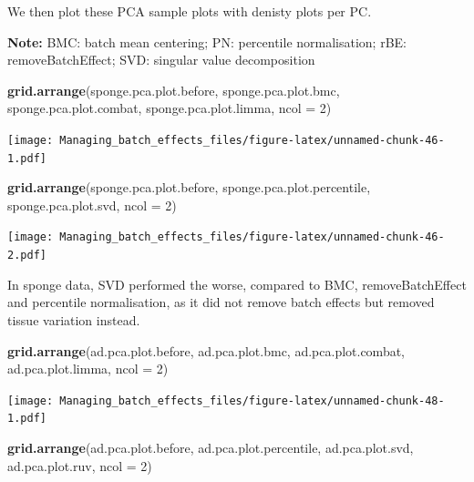 \documentclass[]{book}
\newenvironment{Shaded}{\begin{snugshade}}{\end{snugshade}}
\newcommand{\KeywordTok}[1]{\textcolor[rgb]{0.13,0.29,0.53}{\textbf{#1}}}
\newcommand{\DataTypeTok}[1]{\textcolor[rgb]{0.13,0.29,0.53}{#1}}
\newcommand{\DecValTok}[1]{\textcolor[rgb]{0.00,0.00,0.81}{#1}}
\newcommand{\NormalTok}[1]{#1}
\begin{document}
We then plot these PCA sample plots with denisty plots per PC.

\textbf{Note:} BMC: batch mean centering; PN: percentile normalisation;
rBE: removeBatchEffect; SVD: singular value decomposition

\begin{Shaded}
\begin{Highlighting}[]
\KeywordTok{grid.arrange}\NormalTok{(sponge.pca.plot.before, sponge.pca.plot.bmc, }
\NormalTok{             sponge.pca.plot.combat, sponge.pca.plot.limma, }\DataTypeTok{ncol =} \DecValTok{2}\NormalTok{)}
\end{Highlighting}
\end{Shaded}

\texttt{[image: Managing\_batch\_effects\_files/figure-latex/unnamed-chunk-46-1.pdf]}

\begin{Shaded}
\begin{Highlighting}[]
\KeywordTok{grid.arrange}\NormalTok{(sponge.pca.plot.before, sponge.pca.plot.percentile, }
\NormalTok{             sponge.pca.plot.svd, }\DataTypeTok{ncol =} \DecValTok{2}\NormalTok{)}
\end{Highlighting}
\end{Shaded}

\texttt{[image: Managing\_batch\_effects\_files/figure-latex/unnamed-chunk-46-2.pdf]}

In sponge data, SVD performed the worse, compared to BMC,
removeBatchEffect and percentile normalisation, as it did not remove
batch effects but removed tissue variation instead.

\begin{Shaded}
\begin{Highlighting}[]
\KeywordTok{grid.arrange}\NormalTok{(ad.pca.plot.before, ad.pca.plot.bmc, }
\NormalTok{             ad.pca.plot.combat, ad.pca.plot.limma, }\DataTypeTok{ncol =} \DecValTok{2}\NormalTok{)}
\end{Highlighting}
\end{Shaded}

\texttt{[image: Managing\_batch\_effects\_files/figure-latex/unnamed-chunk-48-1.pdf]}

\begin{Shaded}
\begin{Highlighting}[]
\KeywordTok{grid.arrange}\NormalTok{(ad.pca.plot.before, ad.pca.plot.percentile, }
\NormalTok{             ad.pca.plot.svd, ad.pca.plot.ruv, }\DataTypeTok{ncol =} \DecValTok{2}\NormalTok{)}
\end{Highlighting}
\end{Shaded}
\end{document}
